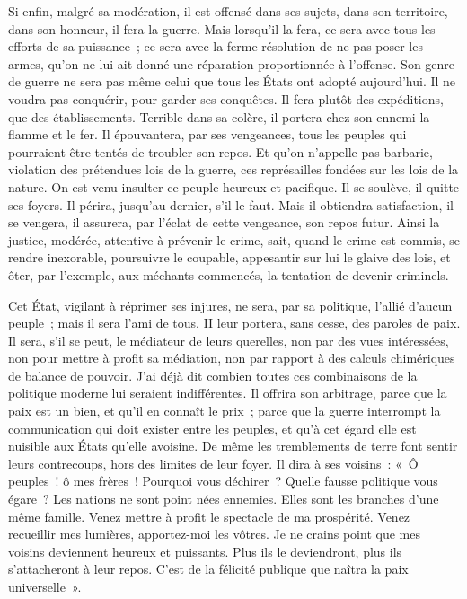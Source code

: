 \documentclass[french,twoside]{book} %
\begin{document}
Si enfin, malgré sa modération, il est offensé dans ses sujets, dans son territoire, dans son honneur, il fera la guerre. Mais lorsqu’il la fera, ce sera avec tous les efforts de sa puissance ; ce sera avec la ferme résolution de ne pas poser les armes, qu’on ne lui ait donné une réparation proportionnée à l’offense. Son genre de guerre ne sera pas même celui que tous les États ont adopté aujourd’hui. Il ne voudra pas conquérir, pour garder ses conquêtes. Il fera plutôt des expéditions, que des établissements. Terrible dans sa colère, il portera chez son ennemi la flamme et le fer. Il épouvantera, par ses vengeances, tous les peuples qui pourraient être tentés de troubler son repos. Et qu’on n’appelle pas barbarie, violation des prétendues lois de la guerre, ces représailles fondées sur les lois de la nature. On est venu insulter ce peuple heureux et pacifique. Il se soulève, il quitte ses foyers. Il périra, jusqu’au dernier, s’il le faut. Mais il obtiendra satisfaction, il se vengera, il assurera, par l’éclat de cette vengeance, son repos futur. Ainsi la justice, modérée, attentive à prévenir le crime, sait, quand le crime est commis, se rendre inexorable, poursuivre le coupable, appesantir sur lui le glaive des lois, et ôter, par l’exemple, aux méchants commencés, la tentation de devenir criminels.\par
Cet État, vigilant à réprimer ses injures, ne sera, par sa politique, l’allié d’aucun peuple ; mais il sera l’ami de tous. II leur portera, sans cesse, des paroles de paix. Il sera, s’il se peut, le médiateur de leurs querelles, non par des vues intéressées, non pour mettre à profit sa médiation, non par rapport à des calculs chimériques de balance de pouvoir. J’ai déjà dit combien toutes ces combinaisons de la politique moderne lui seraient indifférentes. Il offrira son arbitrage, parce que la paix est un bien, et qu’il en connaît le prix ; parce que la guerre interrompt la communication qui doit exister entre les peuples, et qu’à cet égard elle est nuisible aux États qu’elle avoisine. De même les tremblements de terre font sentir leurs contrecoups, hors des limites de leur foyer. Il dira à ses voisins : « Ô peuples ! ô mes frères ! Pourquoi vous déchirer ? Quelle fausse politique vous égare ? Les nations ne sont point nées ennemies. Elles sont les branches d’une même famille. Venez mettre à profit le spectacle de ma prospérité. Venez recueillir mes lumières, apportez-moi les vôtres. Je ne crains point que mes voisins deviennent heureux et puissants. Plus ils le deviendront, plus ils s’attacheront à leur repos. C’est de la félicité publique que naîtra la paix universelle ».\par
\end{document}
